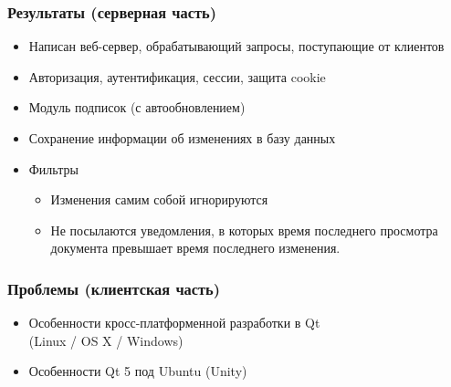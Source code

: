 \documentclass[10pt,pdf,hyperref={unicode}]{beamer}
\begin{document}
    \begin{frame}\frametitle{Результаты (серверная часть)}
        \begin{itemize}%
            \item	Написан веб-сервер, обрабатывающий запросы, поступающие от клиентов            
            \item	Авторизация, аутентификация, сессии, защита cookie
	        \pause
            \item	Модуль подписок (с автообновлением)
            \item	Сохранение информации об изменениях в базу данных
	        \pause
            \item	Фильтры
            \begin{itemize}
                \item Изменения самим собой игнорируются
                \item Не посылаются уведомления, в которых время последнего просмотра документа превышает время последнего изменения.
            \end{itemize}

        \end{itemize}
    \end{frame}
    
    \begin{frame}\frametitle{Проблемы (клиентская часть)}
        \begin{itemize}%
            \item Особенности кросс-платформенной разработки в Qt \\
            (Linux / OS X / Windows)
            \item Особенности Qt 5 под Ubuntu (Unity)
        \end{itemize}
    \end{frame}
    
\end{document}
